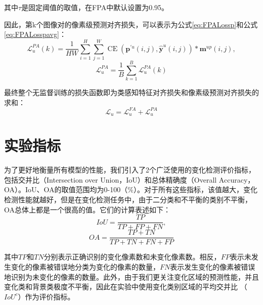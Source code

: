 \documentclass[lang=chs, degree=master, blindreview=false, adobe=false]{yanputhesis}
\begin{document}
其中$\tau$是固定阈值的取值，在FPA中默认设置为0.95。

因此，第k个图像对的像素级预测对齐损失，可以表示为公式\ref{eq:FPALossp}和公式\ref{eq:FPALosspavg}：
\begin{equation}
  \label{eq:FPALossp}
  \mathcal{L}_{u}^{P A}(k)=\frac{1}{H W} \sum_{i=1}^{H} \sum_{j=1}^{W} \operatorname{CE}\left(\mathbf{p}^{\prime u}(i, j), \hat{\mathbf{y}}^{u}(i, j)\right) * \mathbf{m}^{u p}(i, j),
\end{equation}
\begin{equation}
  \label{eq:FPALosspavg}
  \mathcal{L}_{u}^{P A}=\frac{1}{B} \sum_{k=1}^{B} \mathcal{L}_{u}^{P A}(k)
\end{equation}

最终整个无监督训练的损失函数即为类感知特征对齐损失和像素级预测对齐损失的求和：
\begin{equation}
  \label{eq:FPALossu}
  \mathcal{L}_{u}=\mathcal{L}_{u}^{F A}+\mathcal{L}_{u}^{P A}
\end{equation}
\section{实验指标}
为了更好地衡量所有模型的性能，我们引入了2个广泛使用的变化检测评价指标，包括交并比（Intersection over Union，IoU）和总体精确度（Overall Accuracy，OA）。IoU、OA的取值范围均为0-100（$\%$）。对于所有这些指标，该值越大，变化检测性能就越好，但是在变化检测任务中，由于二分类和不平衡的类别不平衡，OA总体上都是一个很高的值。它们的计算表述如下：
\begin{equation}
  \label{eq:IoU}
  I o U=\frac{T P}{T P+F P+F N},
\end{equation}
\begin{equation}
  \label{eq:OA}
  O A=\frac{T P+T N}{T P+T N+F N+F P}
\end{equation}

其中$TP$和$TN$分别表示正确识别的变化像素数和未变化像素数。相反，$FP$表示未发生变化的像素被错误地分类为变化的像素的数量，$FN$表示发生变化的像素被错误地识别为未变化的像素的数量。此外，由于我们更关注变化区域的预测性能，并且变化类和背景类极度不平衡，因此在实验中使用变化类别区域的平均交并比 （$IoU^c$）作为评价指标。
\end{document}
